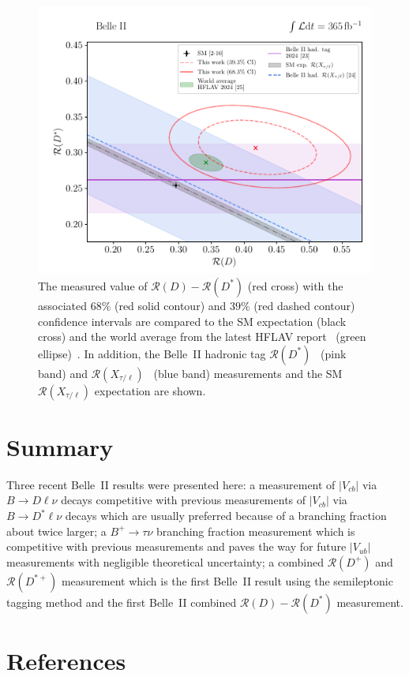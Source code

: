 \documentclass{moriond}
\def\vub{V_{ub}}
\def\vcb{V_{cb}}
\def\btodlnu{B \to D\ell\nu}
\def\btodstlnu{B \to D^*\ell\nu}
\def\rd{\mathcal{R}\left(D\right)}
\def\rdp{\mathcal{R}\left(D^+\right)}
\def\rdst{\mathcal{R}\left(D^*\right)}
\def\rdstp{\mathcal{R}\left(D^{*+}\right)}
\begin{document}
\begin{figure}[h!]
    \centering
    \includegraphics[scale=0.9]{Figures/rd_comp.pdf}
    \caption{The measured value of $\rd-\rdst$ (red cross) with the associated $68\%$ (red solid contour) and $39\%$ (red dashed contour) confidence intervals are compared to the SM expectation (black cross) and the world average from the latest HFLAV report~\cite{hflav} (green ellipse)~\cite{alina}. In addition, the Belle~II hadronic tag $\rdst$~\cite{kojima} (pink band) and $\mathcal{R}(X_{\tau/\ell})$~\cite{henrik} (blue band) measurements and the SM $\mathcal{R}(X_{\tau/\ell})$ expectation are shown.}
    \label{fig:rd_comp}
\end{figure}

\section{Summary}
Three recent Belle~II results were presented here: a measurement of $|\vcb|$ via $\btodlnu$ decays competitive with previous measurements of $|\vcb|$ via $\btodstlnu$ decays which are usually preferred because of a branching fraction about twice larger; a $B^+ \to \tau\nu$ branching fraction measurement which is competitive with previous measurements and paves the way for future $|\vub|$ measurements with negligible theoretical uncertainty; a combined $\rdp$ and $\rdstp$ measurement which is the first Belle~II result using the semileptonic tagging method and the first Belle~II combined $\rd-\rdst$ measurement.


\section*{References}
\end{document}
